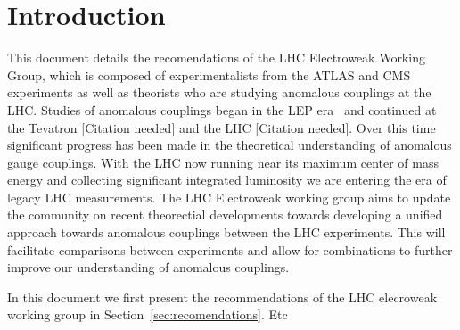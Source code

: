 
\section{Introduction}
\label{sec:intro}

This document details the recomendations of the LHC Electroweak Working Group,
which is composed of experimentalists from the ATLAS and CMS experiments
as well as theorists who are studying anomalous couplings at the LHC.
Studies of anomalous couplings began in the LEP 
era~\cite{DELPHIWWTGC,DELPHINEUTGC,L3NEUTGC,L3WWGQGC,L3NEUQGC,OPALWWTGC,OPALNEUTGC,OPALQGC,ALEPHWWTGC,ALEPHQGC} and 
continued at the Tevatron [Citation needed] and the LHC [Citation needed].
Over this time significant progress has been made 
in the theoretical understanding of anomalous gauge couplings.
With the LHC now running near its maximum center of mass energy
and collecting significant integrated luminosity we are entering
the era of legacy LHC measurements.  The LHC Electroweak working
group aims to update the community on recent theorectial developments
towards developing a unified approach towards anomalous couplings
between the LHC experiments.  This will facilitate comparisons
between experiments and allow for combinations to further improve 
our understanding of anomalous couplings.

In this document we first present the recommendations of the
LHC elecroweak working group in Section~\ref{sec:recomendations}. 
Etc




